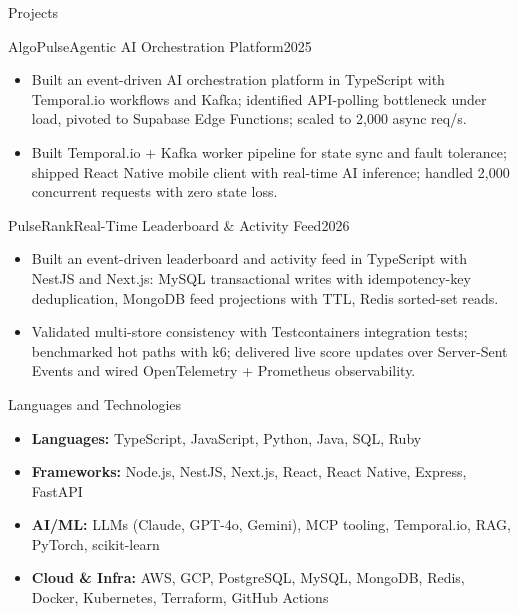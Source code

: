 \documentclass[]{mcdowellcv}
\begin{document}
\begin{cvsection}{Projects}
  \begin{cvsubsection}{AlgoPulse}{Agentic AI Orchestration Platform}{2025}
    \begin{itemize}
      \item Built an event-driven AI orchestration platform in TypeScript with Temporal.io workflows and Kafka; identified API-polling bottleneck under load, pivoted to Supabase Edge Functions; scaled to 2,000 async req/s.
      \item Built Temporal.io + Kafka worker pipeline for state sync and fault tolerance; shipped React Native mobile client with real-time AI inference; handled 2,000 concurrent requests with zero state loss.
    \end{itemize}
    \vspace{-1.5pt}
  \end{cvsubsection}

  \begin{cvsubsection}{PulseRank}{Real-Time Leaderboard \& Activity Feed}{2026}
    \begin{itemize}
      \item Built an event-driven leaderboard and activity feed in TypeScript with NestJS and Next.js: MySQL transactional writes with idempotency-key deduplication, MongoDB feed projections with TTL, Redis sorted-set reads.
      \item Validated multi-store consistency with Testcontainers integration tests; benchmarked hot paths with k6; delivered live score updates over Server-Sent Events and wired OpenTelemetry + Prometheus observability.
    \end{itemize}
    \vspace{-1.5pt}
  \end{cvsubsection}
\end{cvsection}

\begin{cvsection}{Languages and Technologies}
  \begin{cvsubsection}{}{}{}
    \begin{itemize}
      \item \textbf{Languages:} TypeScript, JavaScript, Python, Java, SQL, Ruby
      \item \textbf{Frameworks:} Node.js, NestJS, Next.js, React, React Native, Express, FastAPI
      \item \textbf{AI/ML:} LLMs (Claude, GPT-4o, Gemini), MCP tooling, Temporal.io, RAG, PyTorch, scikit-learn
      \item \textbf{Cloud \& Infra:} AWS, GCP, PostgreSQL, MySQL, MongoDB, Redis, Docker, Kubernetes, Terraform, GitHub Actions
    \end{itemize}
  \end{cvsubsection}
\end{cvsection}
\end{document}
